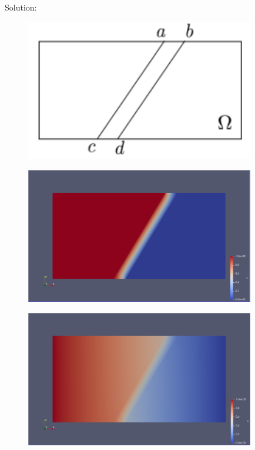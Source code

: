 \documentclass[a4paper]{article}
\begin{document}
\noindent Solution:\\
\begin{figure}[htbp]
	\centering
	\begin{minipage}[t]{0.7\textwidth}
		\centering		\includegraphics[width=10cm]{1.png}
	\end{minipage}
\end{figure}
\begin{figure}[htbp]
	\centering
	\begin{minipage}[t]{0.7\textwidth}
		\centering		\includegraphics[width=10cm]{2.png}
	\end{minipage}
\end{figure}
\begin{figure}[htbp]
	\centering
	\begin{minipage}[t]{0.7\textwidth}
		\centering		\includegraphics[width=10cm]{3.png}
	\end{minipage}
\end{figure}
\end{document}
